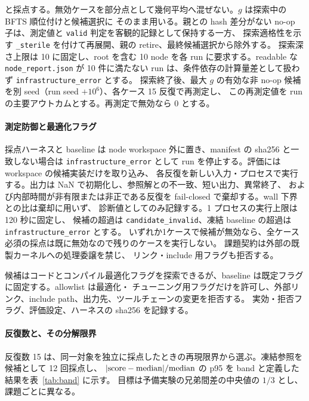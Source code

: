 \documentclass[conference,letterpaper]{IEEEtran}
\begin{document}
と採点する。無効ケースを部分点として幾何平均へ混ぜない。$g$ は探索中の BFTS 順位付けと候補選択に
そのまま用いる。親との hash 差分がない no-op 子は、測定値と \texttt{valid} 判定を客観的記録として保持する一方、
探索適格性を示す \texttt{\_sterile} を付けて再展開、親の retire、最終候補選択から除外する。
探索深さ上限は 10 に固定し、root を含む 10 node を各 run に要求する。readable な
\texttt{node\_report.json} が 10 件に満たない run は、条件依存の計算量差として扱わず
\texttt{infrastructure\_error} とする。
探索終了後、最大 $g$ の有効な非 no-op 候補を別 seed（run seed $+10^6$）、各ケース 15 反復で再測定し、
この再測定値を run の主要アウトカムとする。再測定で無効なら $0$ とする。

\paragraph{測定防御と最適化フラグ}
採点ハーネスと baseline は node workspace 外に置き、manifest の sha256 と一致しない場合は
\texttt{infrastructure\_error} として run を停止する。評価には workspace の候補実装だけを取り込み、
各反復を新しい入力・プロセスで実行する。出力は NaN で初期化し、参照解との不一致、短い出力、異常終了、
および内部時間が非有限または非正である反復を fail-closed で棄却する。wall 下界との比は棄却に用いず、
診断値としてのみ記録する。1 プロセスの実行上限は 120 秒に固定し、
候補の超過は \texttt{candidate\_invalid}、凍結 baseline の超過は \texttt{infrastructure\_error} とする。
いずれか1ケースで候補が無効なら、全ケース必須の採点は既に無効なので残りのケースを実行しない。
課題契約は外部の既製カーネルへの処理委譲を禁じ、
リンク・include 用フラグも拒否する。

候補はコードとコンパイル最適化フラグを探索できるが、baseline は既定フラグに固定する。allowlist は最適化・
チューニング用フラグだけを許可し、外部リンク、include path、出力先、ツールチェーンの変更を拒否する。
実効・拒否フラグ、評価設定、ハーネスの sha256 を記録する。

\paragraph{反復数と、その分解限界}
反復数 15 は、同一対象を独立に採点したときの再現限界から選ぶ。凍結参照を候補として 12 回採点し、
$|{\rm score}-{\rm median}|/{\rm median}$ の p95 を band と定義した結果を表~\ref{tab:band} に示す。
目標は予備実験の兄弟間差の中央値の $1/3$ とし、課題ごとに異なる。
\end{document}
